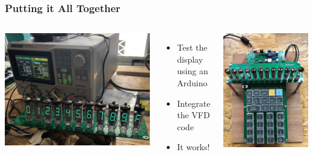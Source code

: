 \documentclass{beamer}
\begin{document}
\begin{frame}
  \frametitle{Putting it All Together}


  \begin{columns}
    \includegraphics[width=\textwidth]{figs/display_11.jpg}
    \begin{itemize}
    \scriptsize
    \item Test the display using an Arduino
    \item Integrate the VFD code
    \item It works!
    \end{itemize}
    \includegraphics[width=\textwidth]{figs/top_with_ps.jpg} \\

\end{columns}
\end{frame}
\end{document}
